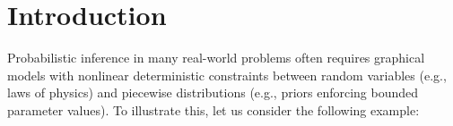 \begin{abstract}

\end{abstract}

\section{Introduction}
\label{sect:intro}

Probabilistic inference in many real-world problems often requires
graphical models with nonlinear deterministic constraints between
random variables (e.g., laws of physics) and piecewise
distributions (e.g., priors enforcing bounded parameter values).
To illustrate this, let us consider the following example:

